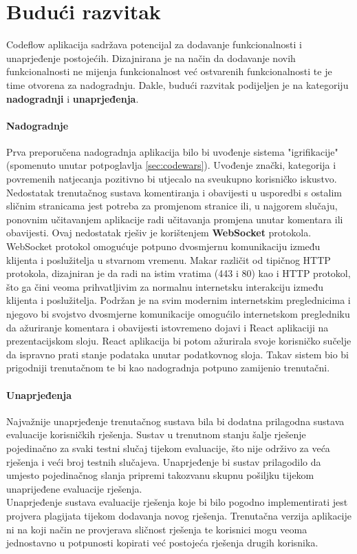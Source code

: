 \documentclass[times, utf8, zavrsni, numeric]{fer}
\begin{document}
	\chapter{Budući razvitak}
	Codeflow aplikacija sadržava potencijal za dodavanje funkcionalnosti i unaprjeđenje postojećih. Dizajnirana je na način da dodavanje novih funkcionalnosti ne mijenja funkcionalnost već ostvarenih funkcionalnosti te je time otvorena za nadogradnju. Dakle, budući razvitak podijeljen je na kategoriju \textbf{nadogradnji} i \textbf{unaprjeđenja}.
	\subsubsection{Nadogradnje}
	Prva preporučena nadogradnja aplikacija bilo bi uvođenje sistema "igrifikacije" (spomenuto unutar potpoglavlja \ref{sec:codewars}). Uvođenje znački, kategorija i povremenih natjecanja pozitivno bi utjecalo na sveukupno korisničko iskustvo.\\
	Nedostatak trenutačnog sustava komentiranja i obavijesti u usporedbi s ostalim sličnim stranicama jest potreba za promjenom stranice ili, u najgorem slučaju, ponovnim učitavanjem aplikacije radi učitavanja promjena unutar komentara ili obavijesti. Ovaj nedostatak rješiv je korištenjem \textbf{WebSocket} protokola. WebSocket\cite{websocket2021} protokol omogućuje potpuno dvosmjernu komunikaciju između klijenta i poslužitelja u stvarnom vremenu. Makar različit od tipičnog HTTP protokola, dizajniran je da radi na istim vratima  (443 i 80) kao i HTTP protokol, što ga čini veoma prihvatljivim za normalnu internetsku interakciju između klijenta i poslužitelja. Podržan je na svim modernim internetskim preglednicima i njegovo bi svojstvo dvosmjerne komunikacije omogućilo internetskom pregledniku da ažuriranje komentara i obavijesti istovremeno dojavi i React aplikaciji na prezentacijskom sloju. React aplikacija bi potom ažurirala svoje korisničko sučelje da ispravno prati stanje podataka unutar podatkovnog sloja. Takav sistem bio bi prigodniji trenutačnom te bi kao nadogradnja potpuno zamijenio trenutačni.
	\subsubsection{Unaprjeđenja}
	Najvažnije unaprjeđenje trenutačnog sustava bila bi dodatna prilagodna sustava evaluacije korisničkih rješenja. Sustav u trenutnom stanju šalje rješenje pojedinačno za svaki testni slučaj tijekom evaluacije, što nije održivo za veća rješenja i veći broj testnih slučajeva. Unaprjeđenje bi sustav prilagodilo da umjesto pojedinačnog slanja pripremi takozvanu skupnu  pošiljku tijekom unaprijeđene evaluacije rješenja.\\
	Unaprjeđenje sustava evaluacije rješenja koje bi bilo pogodno implementirati jest projvera plagijata tijekom dodavanja novog rješenja. Trenutačna verzija aplikacije ni na koji način ne provjerava sličnost rješenja te korisnici mogu veoma jednostavno u potpunosti kopirati već postojeća rješenja drugih korisnika.
	
\end{document}
